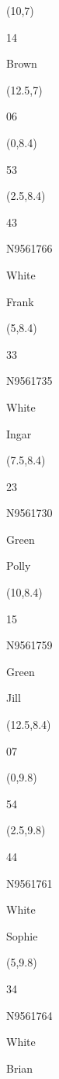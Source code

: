 \documentclass[a4paper]{article}
\newcommand{\myseat}[4]{%
\vspace{-0.1cm}
\parbox[t][2.2cm][t]{3.5cm}{
\small #1 %
\begin{description}
\vspace{-0.1cm}
\item [ID:] #2
\vspace{-0.1cm}
\item [Team:] #3 \normalsize
\vspace{-0.1cm}
\item \normalsize #4
\vspace{-0.1cm}
\end{description}
}
}
\begin{document}
\begin{CJK}{UTF8}{cyberbit}
\begin{textblock}{2.5}(10,7)
\myseat{14}{}{Brown}{}
\end{textblock}

\begin{textblock}{2.5}(12.5,7)
\textblockcolor{}
\myseat{06}{}{}{}
\end{textblock}

\begin{textblock}{2.5}(0,8.4)
\textblockcolor{}
\myseat{53}{}{}{}
\end{textblock}

\begin{textblock}{2.5}(2.5,8.4)
\myseat{43}{N9561766}{White}{Frank}
\end{textblock}

\begin{textblock}{2.5}(5,8.4)
\myseat{33}{N9561735}{White}{Ingar}
\end{textblock}

\begin{textblock}{2.5}(7.5,8.4)
\myseat{23}{N9561730}{Green}{Polly}
\end{textblock}

\begin{textblock}{2.5}(10,8.4)
\myseat{15}{N9561759}{Green}{Jill}
\end{textblock}

\begin{textblock}{2.5}(12.5,8.4)
\textblockcolor{}
\myseat{07}{}{}{}
\end{textblock}

\begin{textblock}{2.5}(0,9.8)
\textblockcolor{}
\myseat{54}{}{}{}
\end{textblock}

\begin{textblock}{2.5}(2.5,9.8)
\myseat{44}{N9561761}{White}{Sophie}
\end{textblock}

\begin{textblock}{2.5}(5,9.8)
\myseat{34}{N9561764}{White}{Brian}
\end{textblock}


\end{CJK}
\end{document}
